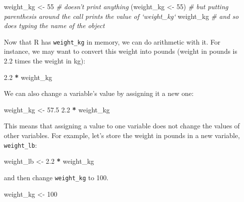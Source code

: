 \documentclass[]{book}
\newenvironment{Shaded}{\begin{snugshade}}{\end{snugshade}}
\newcommand{\DecValTok}[1]{\textcolor[rgb]{0.00,0.00,0.81}{#1}}
\newcommand{\FloatTok}[1]{\textcolor[rgb]{0.00,0.00,0.81}{#1}}
\newcommand{\StringTok}[1]{\textcolor[rgb]{0.31,0.60,0.02}{#1}}
\newcommand{\CommentTok}[1]{\textcolor[rgb]{0.56,0.35,0.01}{\textit{#1}}}
\newcommand{\OperatorTok}[1]{\textcolor[rgb]{0.81,0.36,0.00}{\textbf{#1}}}
\newcommand{\NormalTok}[1]{#1}
\theoremstyle{definition}
\theoremstyle{definition}
\theoremstyle{remark}
\begin{document}
\begin{Shaded}
\begin{Highlighting}[]
\NormalTok{weight_kg <-}\StringTok{ }\DecValTok{55}    \CommentTok{# doesn't print anything}
\NormalTok{(weight_kg <-}\StringTok{ }\DecValTok{55}\NormalTok{)  }\CommentTok{# but putting parenthesis around the call prints the value of `weight_kg`}
\NormalTok{weight_kg          }\CommentTok{# and so does typing the name of the object}
\end{Highlighting}
\end{Shaded}

Now that R has \texttt{weight\_kg} in memory, we can do arithmetic with
it. For instance, we may want to convert this weight into pounds (weight
in pounds is 2.2 times the weight in kg):

\begin{Shaded}
\begin{Highlighting}[]
\FloatTok{2.2} \OperatorTok{*}\StringTok{ }\NormalTok{weight_kg}
\end{Highlighting}
\end{Shaded}

We can also change a variable's value by assigning it a new one:

\begin{Shaded}
\begin{Highlighting}[]
\NormalTok{weight_kg <-}\StringTok{ }\FloatTok{57.5}
\FloatTok{2.2} \OperatorTok{*}\StringTok{ }\NormalTok{weight_kg}
\end{Highlighting}
\end{Shaded}

This means that assigning a value to one variable does not change the
values of other variables. For example, let's store the weight in pounds
in a new variable, \texttt{weight\_lb}:

\begin{Shaded}
\begin{Highlighting}[]
\NormalTok{weight_lb <-}\StringTok{ }\FloatTok{2.2} \OperatorTok{*}\StringTok{ }\NormalTok{weight_kg}
\end{Highlighting}
\end{Shaded}

and then change \texttt{weight\_kg} to 100.

\begin{Shaded}
\begin{Highlighting}[]
\NormalTok{weight_kg <-}\StringTok{ }\DecValTok{100}
\end{Highlighting}
\end{Shaded}
\end{document}
